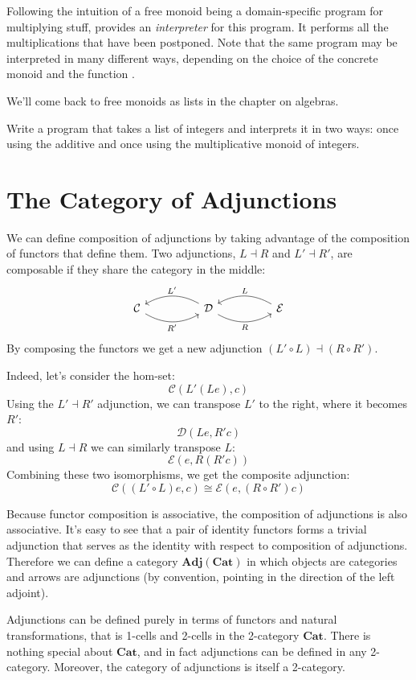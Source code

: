 \documentclass[DaoFP]{subfiles}
\begin{document}
Following the intuition of a free monoid being a domain-specific program for multiplying stuff,  provides an \emph{interpreter} for this program. It performs all the multiplications that have been postponed. Note that the same program may be interpreted in many different ways, depending on the choice of the concrete monoid and the function .

We'll come back to free monoids as lists in the chapter on algebras.

\begin{exercise}
Write a program that takes a list of integers and interprets it in two ways: once using the additive and once using the multiplicative monoid of integers.
\end{exercise}
\section{The Category of Adjunctions}
We can define composition of adjunctions by taking advantage of the composition of functors that define them. Two adjunctions, $L \dashv R$ and $L' \dashv R'$, are composable if they share the category in the middle:
\[
 \begin{tikzcd}
  \mathcal{C}
  \arrow[rr, bend right, "R'"']
  &&
  \mathcal{D}
  \arrow[ll, bend right, "L'"']
    \arrow[rr, bend right, "R"']
&&
  \mathcal{E}
  \arrow[ll, bend right, "L"']
 \end{tikzcd}
\]
By composing the functors we get a new adjunction $(L' \circ L) \dashv (R \circ R')$. 

Indeed, let's consider the hom-set:
\[ \mathcal{C}(L' (L e), c) \]
Using the $L' \dashv R'$ adjunction, we can transpose $L'$ to the right, where it becomes $R'$:
\[ \mathcal{D}(L e, R' c) \]
and using $L \dashv R$ we can similarly transpose $L$:
\[ \mathcal{E}( e, R(R' c)) \]
Combining these two isomorphisms, we get the composite adjunction:
\[ \mathcal{C}((L' \circ L) e, c) \cong \mathcal{E}( e, (R \circ R') c)\]

Because functor composition is associative, the composition of adjunctions is also associative. It's easy to see that a pair of identity functors forms a trivial adjunction that serves as the identity with respect to composition of adjunctions. Therefore we can define a category $\mathbf{Adj}(\mathbf{Cat})$ in which objects are categories and arrows are adjunctions (by convention, pointing in the direction of the left adjoint). 

Adjunctions can be defined purely in terms of functors and natural transformations, that is 1-cells and 2-cells in the 2-category $\mathbf{Cat}$. There is nothing special about $\mathbf{Cat}$, and in fact adjunctions can be defined in any 2-category. Moreover, the category of adjunctions is itself a 2-category.
\end{document}

